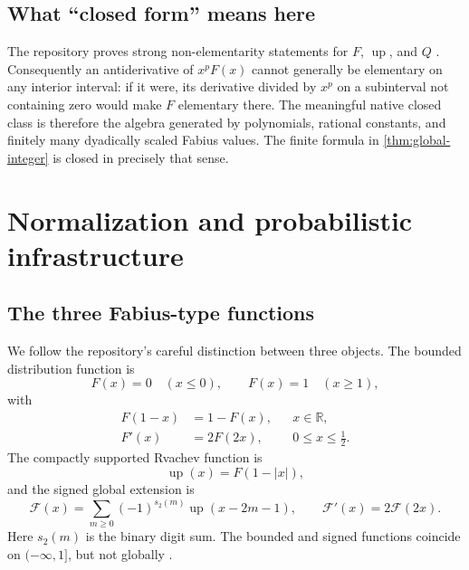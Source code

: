 \documentclass[11pt,oneside]{article}
\theoremstyle{definition}
\theoremstyle{remark}
\newcommand{\Fs}{\mathcal F}
\newcommand{\Up}{\operatorname{up}}
\newcommand{\R}{\mathbb R}
\newcommand{\1}{\mathbf 1}
\begin{document}
\subsection{What ``closed form'' means here}
The repository proves strong non-elementarity statements for \(F\), \(\Up\),
and \(Q\) \cite{ProveItNonElementary,ProveItFrontiers}.  Consequently an
antiderivative of \(x^pF(x)\) cannot generally be elementary on any interior
interval: if it were, its derivative divided by \(x^p\) on a subinterval not
containing zero would make \(F\) elementary there.  The meaningful native
closed class is therefore the algebra generated by polynomials, rational
constants, and finitely many dyadically scaled Fabius values.  The finite
formula in \cref{thm:global-integer} is closed in precisely that sense.

\section{Normalization and probabilistic infrastructure}

\subsection{The three Fabius-type functions}
We follow the repository's careful distinction between three objects.  The
bounded distribution function is
\[
 F(x)=0\quad(x\leq0),\qquad F(x)=1\quad(x\geq1),
\]
with
\begin{align}
 F(1-x)&=1-F(x), &&x\in\R,                                      \label{eq:F-reflect}\\
 F'(x)&=2F(2x), &&0\leq x\leq\tfrac12.                           \label{eq:F-left-diff}
\end{align}
The compactly supported Rvachev function is
\begin{equation}
 \Up(x)=F(1-|x|),                                                \label{eq:up-def}
\end{equation}
and the signed global extension is
\begin{equation}
 \Fs(x)=\sum_{m\geq0}(-1)^{s_2(m)}\Up(x-2m-1),
 \qquad \Fs'(x)=2\Fs(2x).                                      \label{eq:signed-def}
\end{equation}
Here \(s_2(m)\) is the binary digit sum.  The bounded and signed functions
coincide on \(( -\infty,1]\), but not globally
\cite{ProveItPrimary,AriasArithmetic}.
\end{document}
